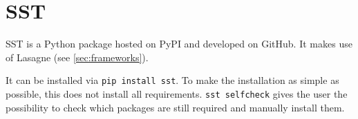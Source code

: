 
\section{SST}\label{sec:SST}
\Gls{SST} is a Python package hosted on \gls{PyPI} and developed on GitHub. It
makes use of Lasagne (see \cref{sec:frameworks}).

It can be installed via \verb+pip install sst+. To make the installation as
simple as possible, this does not install all requirements.
\verb+sst selfcheck+ gives the user the possibility to check which packages
are still required and manually install them.
